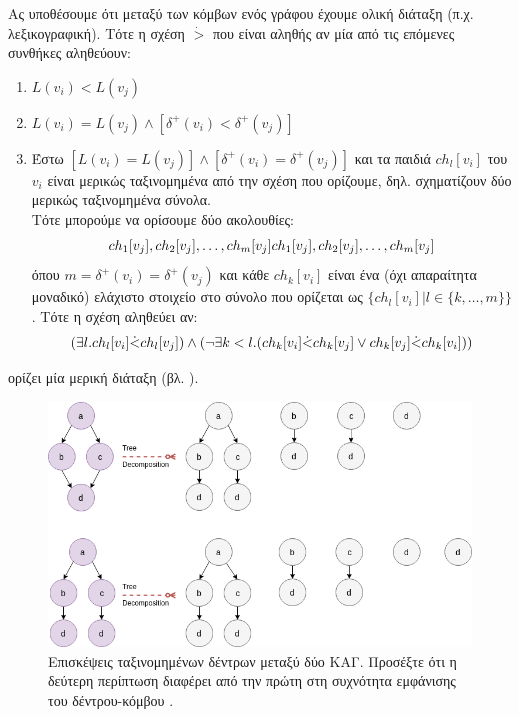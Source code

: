 \begin{definition}
Ας υποθέσουμε ότι μεταξύ των κόμβων ενός γράφου έχουμε ολική διάταξη (π.χ. λεξικογραφική).
Τότε η σχέση $\dot{>}$ που είναι αληθής αν μία από τις επόμενες συνθήκες αληθεύουν:
\begin{enumerate}
\item $L(v_{i}) < L(v_{j})$
\item $L(v_{i}) = L(v_{j}) \wedge [\delta^{+}(v_{i}) < \delta^{+}(v_{j})]$
\item Έστω $[L(v_{i}) = L(v_{j})] \wedge [\delta^{+}(v_{i}) = \delta^{+}(v_{j})]$ και τα παιδιά $ch_{l}[v_{i}]$ του $v_{i}$ είναι μερικώς ταξινομημένα από την σχέση που ορίζουμε, δηλ. σχηματίζουν δύο μερικώς ταξινομημένα σύνολα.\\
Τότε μπορούμε να ορίσουμε δύο ακολουθίες:
$$
ch_{1}[v_{j}], ch_{2}[v_{j}], \dots, ch_{m}[v_{j}]\\
ch_{1}[v_{j}], ch_{2}[v_{j}], \dots, ch_{m}[v_{j}]
$$
όπου $m = \delta^{+}(v_{i}) = \delta^{+}(v_{j})$ και κάθε $ch_{k}[v_{i}]$ είναι ένα (όχι απαραίτητα μοναδικό) ελάχιστο στοιχείο στο σύνολο που ορίζεται ως $\{ch_{l}[v_{i}]|l\in \{k, \dots, m\}\}$.
Τότε η σχέση αληθεύει αν:
$$
(\exists l.ch_{l}[v_{i}]\dot{<}ch_{l}[v_{j}]) \wedge \\
(\neg \exists k < l.(ch_{k}[v_{i}]\dot{<}ch_{k}[v_{j}] \vee ch_{k}[v_{j}]\dot{<}ch_{k}[v_{i}]))
$$
\end{enumerate}
ορίζει μία μερική διάταξη (βλ. \cite[]{Martino2012ATK}).
\end{definition}

\begin{figure}[]
\centering
\includegraphics[width=\textwidth]{figures/odd_sth_2}
\caption{Επισκέψεις ταξινομημένων δέντρων μεταξύ δύο ΚΑΓ. Προσέξτε ότι η δεύτερη περίπτωση διαφέρει από την πρώτη στη συχνότητα εμφάνισης του δέντρου-κόμβου .}
\label{fig:odd_sth_2}
\end{figure}

